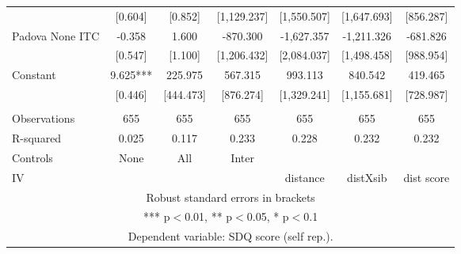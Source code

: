 \begin{tabular}{lcccccc}
 & [0.604] & [0.852] & [1,129.237] & [1,550.507] & [1,647.693] & [856.287] \\
Padova None ITC & -0.358 & 1.600 & -870.300 & -1,627.357 & -1,211.326 & -681.826 \\
 & [0.547] & [1.100] & [1,206.432] & [2,084.037] & [1,498.458] & [988.954] \\
Constant & 9.625*** & 225.975 & 567.315 & 993.113 & 840.542 & 419.465 \\
 & [0.446] & [444.473] & [876.274] & [1,329.241] & [1,155.681] & [728.987] \\
 &  &  &  &  &  &  \\
Observations & 655 & 655 & 655 & 655 & 655 & 655 \\
R-squared & 0.025 & 0.117 & 0.233 & 0.228 & 0.232 & 0.232 \\
Controls & None & All & Inter &  &  &  \\
 IV &  &  &  & distance & distXsib & dist score \\ \hline
\multicolumn{7}{c}{ Robust standard errors in brackets} \\
\multicolumn{7}{c}{ *** p$<$0.01, ** p$<$0.05, * p$<$0.1} \\
\multicolumn{7}{c}{ Dependent variable: SDQ score (self rep.).} \\
\end{tabular}
